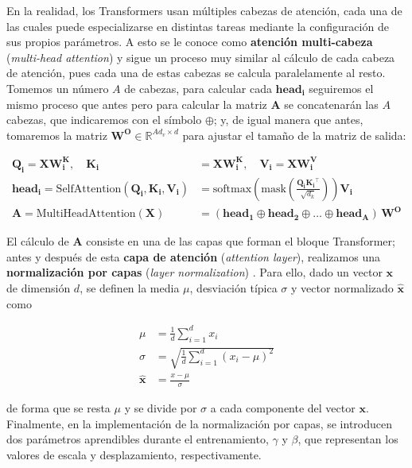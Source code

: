 \documentclass[12pt,twoside]{article}
\begin{document}
En la realidad, los Transformers usan múltiples cabezas de atención, cada una de las cuales puede especializarse en distintas tareas mediante la configuración de sus propios parámetros. A esto se le conoce como \textbf{atención multi-cabeza} (\textit{multi-head attention}) y sigue un proceso muy similar al cálculo de cada cabeza de atención, pues cada una de estas cabezas se calcula paralelamente al resto. Tomemos un número $A$ de cabezas, para calcular cada $\mathbf{head_i}$ seguiremos el mismo proceso que antes pero para calcular la matriz $\mathbf{A}$ se concatenarán las $A$ cabezas, que indicaremos con el símbolo $\oplus$; y, de igual manera que antes, tomaremos la matriz $\mathbf{W^O}\in\mathbb{R}^{Ad_v\times d}$ para ajustar el tamaño de la matriz de salida:

\begin{align}
\mathbf{Q_i}=\mathbf{XW^K_i}, \quad \mathbf{K_i} &= \mathbf{XW^K_i}, \quad \mathbf{V_i}=\mathbf{XW^V_i} \\
\mathbf{head_i} = \text{SelfAttention}\left( \mathbf{Q_i,K_i,V_i} \right) &= \text{softmax} \left( \text{mask} \left( \frac{\mathbf{Q_i K_i}^\top}{\sqrt{d_k}} \right) \right) \mathbf{V_i} \\
\mathbf{A} = \text{MultiHeadAttention}\left( \mathbf{X} \right) &= \left(\mathbf{head_1}\oplus\mathbf{head_2}\oplus\dots\oplus\mathbf{head_A} \right) \, \mathbf{W^O}
\end{align}

El cálculo de $\mathbf{A}$ consiste en una de las capas que forman el bloque Transformer; antes y después de esta \textbf{capa de atención} (\textit{attention layer}), realizamos una \textbf{normalización por capas} (\textit{layer normalization}) \cite{LayerNorm}. Para ello, dado un vector $\mathbf{x}$ de dimensión $d$, se definen la media $\mu$, desviación típica $\sigma$ y vector normalizado $\hat{\mathbf{x}}$ como

\begin{align}
    \mu &= \frac{1}{d}\sum_{i=1}^d x_i \\
    \sigma &= \sqrt{\frac{1}{d}\sum_{i=1}^{d}(x_i-\mu)^{2}} \\
    \hat{\mathbf{x}} &= \frac{x-\mu}{\sigma}
\end{align}

de forma que se resta $\mu$ y se divide por $\sigma$ a cada componente del vector $\mathbf{x}$. Finalmente, en la implementación de la normalización por capas, se introducen dos parámetros aprendibles durante el entrenamiento, $\gamma$ y $\beta$, que representan los valores de escala y desplazamiento, respectivamente.
\end{document}
